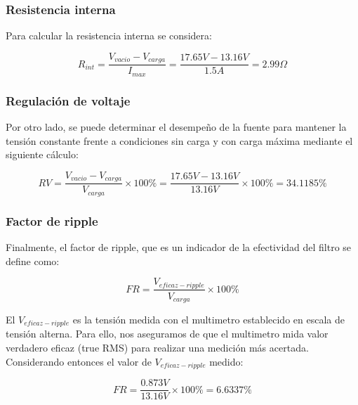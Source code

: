 \documentclass[chaptersright]{informeutn}
\begin{document}
        \subsubsection{Resistencia interna}

        Para calcular la resistencia interna se considera:

        \begin{equation*}
            R_{int} = \frac{V_{vacio} - V_{carga}}{I_{max}}= \frac{17.65V - 13.16V}{1.5A} = 2.99\Omega
        \end{equation*}

        \subsubsection{Regulación de voltaje}

        Por otro lado, se puede determinar el desempeño de la fuente para mantener la tensión constante frente a
        condiciones sin carga y con carga máxima mediante el siguiente cálculo:

        \begin{equation*}
            RV = \frac{V_{vacio} -V_{carga}}{V_{carga}} \times 100\% = \frac{17.65V-13.16V}{13.16V} \times 100\% = 34.1185\%
        \end{equation*}

        \subsubsection{Factor de ripple}

        Finalmente, el factor de ripple, que es un indicador de la efectividad del filtro se define como:

        \begin{equation*}
            FR = \frac{V_{eficaz-ripple}}{V_{carga}} \times 100\%
        \end{equation*}

        El $V_{eficaz-ripple}$ es la tensión medida con el multimetro establecido en escala de tensión alterna.
        Para ello, nos aseguramos de que el multimetro mida valor verdadero eficaz (true RMS) para realizar una
        medición más acertada. Considerando entonces el valor de $V_{eficaz-ripple}$ medido:

        \begin{equation*}
            FR = \frac{0.873V}{13.16V} \times 100\% = 6.6337\%
        \end{equation*}
\end{document}
